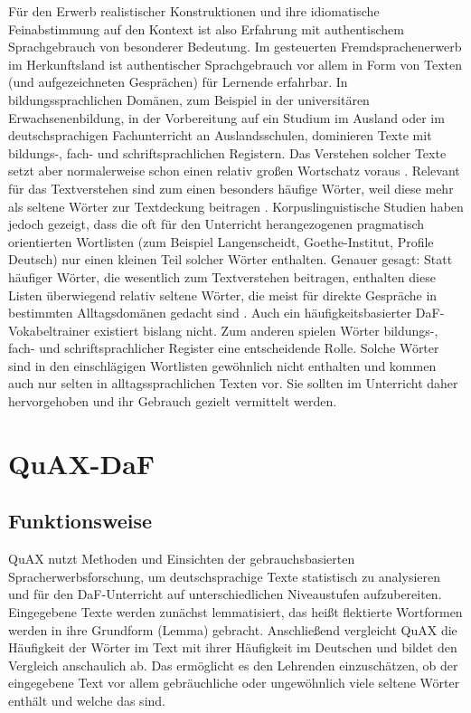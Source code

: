 \documentclass[11pt]{article}\usepackage[]{graphicx}\usepackage[]{color}
\begin{document}
Für den Erwerb realistischer Konstruktionen und ihre idiomatische Feinabstimmung auf den Kontext ist also Erfahrung mit authentischem Sprachgebrauch von besonderer Bedeutung. Im gesteuerten Fremdsprachenerwerb im Herkunftsland ist authentischer Sprachgebrauch vor allem in Form von Texten (und aufgezeichneten Gesprächen) für Lernende erfahrbar. In bildungssprachlichen Domänen, zum Beispiel in der universitären Erwachsenenbildung, in der Vorbereitung auf ein Studium im Ausland oder im deutschsprachigen Fachunterricht an Auslandsschulen, dominieren Texte mit bildungs-, fach- und schriftsprachlichen Registern. Das Verstehen solcher Texte setzt aber normalerweise schon einen relativ großen Wortschatz voraus \parencite{Tschirner.2019}. Relevant für das Textverstehen sind zum einen besonders häufige Wörter, weil diese mehr als seltene Wörter zur Textdeckung beitragen \parencite{Nation.2006}. Korpuslinguistische Studien haben jedoch gezeigt, dass die oft für den Unterricht herangezogenen pragmatisch orientierten Wortlisten (zum Beispiel Langenscheidt, Goethe-Institut, Profile Deutsch) nur einen kleinen Teil solcher Wörter enthalten. Genauer gesagt: Statt häufiger Wörter, die wesentlich zum Textverstehen beitragen, enthalten diese Listen überwiegend relativ seltene Wörter, die meist für direkte Gespräche in bestimmten Alltagsdomänen gedacht sind \parencite{Tschirner.2006}. Auch ein häufigkeitsbasierter DaF-Vokabeltrainer existiert bislang nicht. Zum anderen spielen Wörter bildungs-, fach- und schriftsprachlicher Register eine entscheidende Rolle. Solche Wörter sind in den einschlägigen Wortlisten gewöhnlich nicht enthalten und kommen auch nur selten in alltagssprachlichen Texten vor. Sie sollten im Unterricht daher hervorgehoben und ihr Gebrauch gezielt vermittelt werden. 

\section{QuAX-DaF}

\subsection{Funktionsweise}

QuAX nutzt Methoden und Einsichten der gebrauchsbasierten Spracherwerbsforschung, um deutschsprachige Texte statistisch zu analysieren und für den DaF-Unterricht auf unterschiedlichen Niveaustufen aufzubereiten. Eingegebene Texte werden zunächst lemmatisiert, das heißt flektierte Wortformen werden in ihre Grundform (Lemma) gebracht. Anschließend vergleicht QuAX die Häufigkeit der Wörter im Text mit ihrer Häufigkeit im Deutschen und bildet den Vergleich anschaulich ab. Das ermöglicht es den Lehrenden einzuschätzen, ob der eingegebene Text vor allem gebräuchliche oder ungewöhnlich viele seltene Wörter enthält und welche das sind. 
\end{document}
